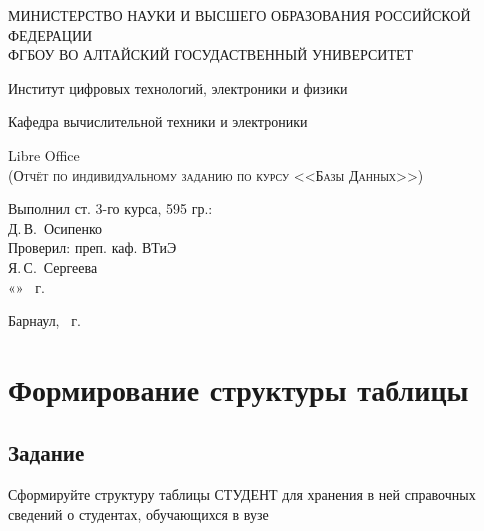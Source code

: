 \documentclass[a4paper, 12pt]{article}
\begin{document}
\begin{titlepage}
  \begin{center}
    \MakeUppercase{Министерство науки и высшего образования Российской Федерации} \\
    \MakeUppercase{ФГБОУ ВО Алтайский госудаственный университет}
    \vspace{0.25cm}
    
	  Институт цифровых технологий, электроники и физики
    
    Кафедра вычислительной техники и электроники
    \vfill
    
    {\LARGE Libre Office}\\[5mm]
    \textsc{(Отчёт по индивидуальному заданию по курсу <<Базы Данных>>)}
  \bigskip

\end{center}
\vfill

\newlength{\ML}
\hfill
\begin{minipage}{0.45\textwidth}
  Выполнил ст. 3-го курса, 595 гр.:\\
  \underline{\hspace{\ML}} Д.\,В.~Осипенко\\
  Проверил: преп. каф. ВТиЭ\\
  \underline{\hspace{\ML}} Я.\,С.~Сергеева\\
  «\underline{\hspace{0.7cm}}» \underline{\hspace{2cm}} \the\year~г.
\end{minipage}%
\vfill

\begin{center}
  Барнаул, \the\year~г.
\end{center}
\end{titlepage}
\tableofcontents
\newpage
\section{Формирование структуры таблицы}
\subsection{Задание}
 Сформируйте  структуру  таблицы  СТУДЕНТ  для  хранения  в  ней 
справочных сведений о студентах, обучающихся в вузе 
\end{document}
